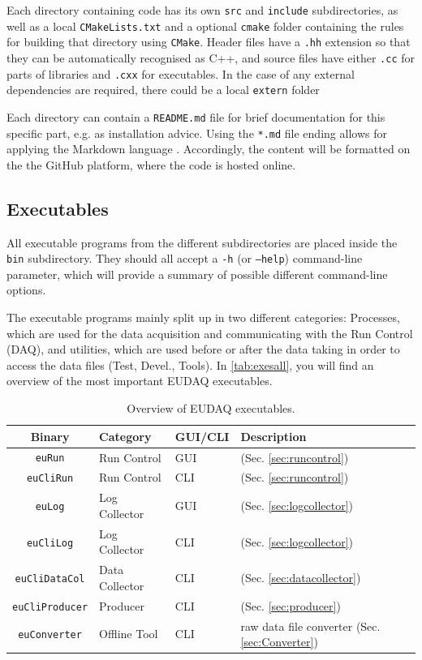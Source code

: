 Each directory containing code has its own \texttt{src} and \texttt{include} subdirectories,
as well as a local \texttt{CMakeLists.txt} and a optional \texttt{cmake} folder containing the rules
for building that directory using \texttt{CMake}.
Header files have a \texttt{.hh} extension so that they can be automatically recognised as C++,
and source files have either \texttt{.cc} for parts of libraries and \texttt{.cxx} for executables.
In the case of any external dependencies are required, there could be a local \texttt{extern} folder

Each directory can contain a \texttt{README.md} file for brief documentation for this specific part, e.g.  
as installation advice. 
Using the \texttt{*.md} file ending allows for applying the Markdown language \cite{markdownWWW}. 
Accordingly, the content will be formatted on the the GitHub platform, where the code is hosted online.

\subsection{Executables}
All executable programs from the different subdirectories are placed inside the \texttt{bin} subdirectory. They should all accept a \texttt{-h} (or \texttt{--help}) command-line parameter, which will provide a summary of possible different command-line options.

The executable programs mainly split up in two different categories: Processes, which are used for the data acquisition and communicating with the Run Control (DAQ), and utilities, which are used before or after the data taking in order to access the data files (Test, Devel., Tools).
In \autoref{tab:exesall}, you will find an overview of the most important EUDAQ executables.

\begin{table}
\centering
\small
\begin{tabular}{ c | l | l | p{4cm}}
  \textbf{Binary} & \textbf{Category} & \textbf{GUI/CLI}  & \textbf{Description}\\
  \hline
  \hline
  \texttt{euRun} & Run Control & GUI & (Sec. \ref{sec:runcontrol}) \\
  \texttt{euCliRun} & Run Control & CLI & (Sec. \ref{sec:runcontrol}) \\
  \texttt{euLog} & Log Collector & GUI & (Sec. \ref{sec:logcollector}) \\
  \texttt{euCliLog} & Log Collector & CLI & (Sec. \ref{sec:logcollector}) \\
  \texttt{euCliDataCol} & Data Collector & CLI & (Sec. \ref{sec:datacollector}) \\
  \texttt{euCliProducer} & Producer & CLI & (Sec. \ref{sec:producer}) \\
  \hline
  \texttt{euConverter} & Offline Tool & CLI & raw data file converter (Sec. \ref{sec:Converter}) \\
\end{tabular}
\caption{Overview of EUDAQ executables.}
\label{tab:exesall}
\end{table}


